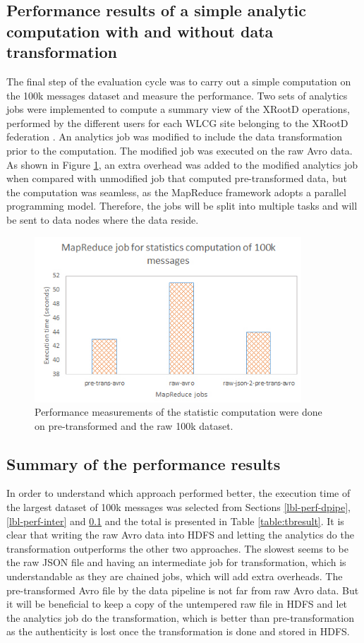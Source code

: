 \subsection{Performance results of a simple analytic computation with and without data transformation} \label{lbl-perf-mr}
The final step of the evaluation cycle was to carry out a simple computation on the 100k messages dataset and measure the performance. Two sets of analytics jobs were implemented to compute a summary view of the XRootD operations, performed by the different users for each WLCG site belonging to the XRootD federation \cite{Gardner19}. An analytics job was modified to include the data transformation prior to the computation. The modified job was executed on the raw Avro data. As shown in Figure \ref{fig:mr_stats}, an extra overhead was added to the modified analytics job when compared with unmodified job that computed pre-transformed data, but the computation was seamless, as the MapReduce framework adopts a parallel programming model. Therefore, the jobs will be split into multiple tasks and will be sent to data nodes where the data reside.

\begin{figure}[H]
  \centering
  \includegraphics[width=100mm]{./Figures/mr_stats_perf.jpg}
  \caption{\small Performance measurements of the statistic computation were done on pre-transformed and the raw 100k dataset.}\label{fig:mr_stats}
\end{figure}

\subsection{Summary of the performance results} 
In order to understand which approach performed better, the execution time of the largest dataset of 100k messages was selected from Sections \ref{lbl-perf-dpipe}, \ref{lbl-perf-inter} and \ref{lbl-perf-mr} and the total is presented in Table \ref{table:tbresult}. It is clear that writing the raw Avro data into HDFS and letting the analytics do the transformation outperforms the other two approaches. The slowest seems to be the raw JSON file and having an intermediate job for transformation, which is understandable as they are chained jobs, which will add extra overheads. The pre-transformed Avro file by the data pipeline is not far from raw Avro data. But it will be beneficial to keep a copy of the untempered raw file in HDFS and let the analytics job do the transformation, which is better than pre-transformation as the authenticity is lost once the transformation is done and stored in HDFS.

